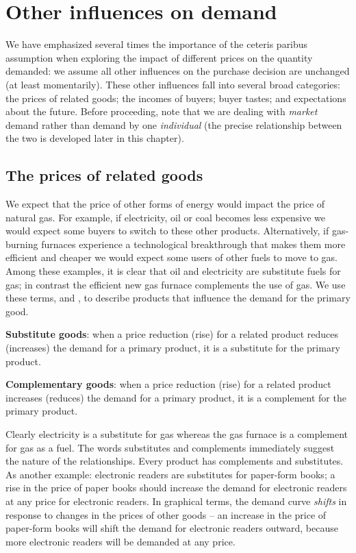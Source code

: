 \section{Other influences on demand}\label{sec:ch3sec4}

We have emphasized several times the importance of the ceteris paribus assumption when exploring the impact of different prices on the quantity demanded: we assume all other influences on the purchase decision are unchanged (at least momentarily). These other influences fall into several broad categories: the prices of related goods; the incomes of buyers; buyer tastes; and expectations about the future. Before proceeding, note that we are dealing with \textit{market} demand rather than demand by one \textit{individual} (the precise relationship between the two is developed later in this chapter).

\subsection*{The prices of related goods}

We expect that the price of other forms of energy would impact the price of natural gas. For example, if electricity, oil or coal becomes less expensive we would expect some buyers to switch to these other products. Alternatively, if gas-burning furnaces experience a technological breakthrough that makes them more efficient and cheaper we would expect some users of other fuels to move to gas. Among these examples, it is clear that oil and electricity are substitute fuels for gas; in contrast the efficient new gas furnace complements the use of gas. We use these terms,  and , to describe products that influence the demand for the primary good. 

\begin{DefBox}
\textbf{Substitute goods}: when a price reduction (rise) for a related product reduces (increases) the demand for a primary product, it is a substitute for the primary product.

\textbf{Complementary goods}: when a price reduction (rise) for a related product increases (reduces) the demand for a primary product, it is a complement for the primary product.
\end{DefBox}

Clearly electricity is a substitute for gas whereas the gas furnace is a complement for gas as a fuel. The words substitutes and complements immediately suggest the nature of the relationships. Every product has complements and substitutes. As another example: electronic readers are substitutes for paper-form books; a rise in the price of paper books should increase the demand for electronic readers at any price for electronic readers. In graphical terms, the demand curve \textit{shifts} in response to changes in the prices of other goods -- an increase in the price of paper-form books will shift the demand for electronic readers outward, because more electronic readers will be demanded at any price.

